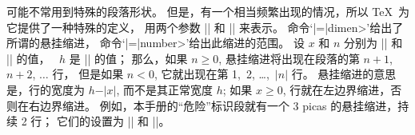 \danger 可能不常用到特殊的段落形状。%
但是，有一个相当频繁出现的情况，所以 \TeX\ 为它提供了一种特殊的定义，
用两个参数 |\hangindent| 和 |\hangafter| 来表示。%
命令`|\hangindent=|\<dimen>'给出了所谓的悬挂缩进，
命令`|\hangafter=|\<number>'给出此缩进的范围。%
设 $x$ 和 $n$ 分别为 |\hangindent| 和 |\hangafter| 的值，
~$h$ 是 |\hsize| 的值；
那么，如果 $n\ge0$, 悬挂缩进将出现在段落的第 $n+1$,
$n+2$, $\ldots$ 行，
但是如果 $n<0$, 它就出现在第 1,~2, \dots,~$\vert n\vert$ 行。%
悬挂缩进的意思是，行的宽度为 $h-\vert x\vert$, 而不是其正常宽度 $h$;
如果 $x\ge0$, 行就在左边界缩进，否则在右边界缩进。%
例如，本手册的``危险''标识段就有一个 3 picas 的悬挂缩进，持续 2 行；
它们的设置为 |\hangindent=3pc| 和 ||。

